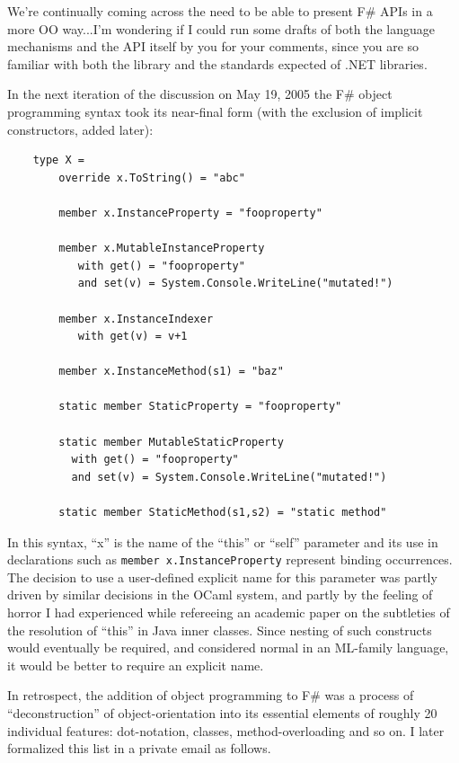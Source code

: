 \documentclass[acmsmall]{acmart}\settopmatter{}
\begin{document}
\begin{verbquote}
We're continually coming across the need to be able to present F# APIs in a more OO way...I'm wondering if I could run some drafts of both the language mechanisms and the API itself by you for your comments, since you are so familiar with both the library and the standards expected of .NET libraries. 
\end{verbquote}
In the next iteration of the discussion on May 19, 2005 the F\# object programming syntax took its near-final form (with the exclusion of implicit constructors, added later):
\begin{verbatim}
    type X =
        override x.ToString() = "abc"

        member x.InstanceProperty = "fooproperty"

        member x.MutableInstanceProperty
           with get() = "fooproperty"
           and set(v) = System.Console.WriteLine("mutated!")
    
        member x.InstanceIndexer
           with get(v) = v+1
     
        member x.InstanceMethod(s1) = "baz"

        static member StaticProperty = "fooproperty"

        static member MutableStaticProperty
          with get() = "fooproperty"
          and set(v) = System.Console.WriteLine("mutated!")
    
        static member StaticMethod(s1,s2) = "static method"
\end{verbatim}

In this syntax, ``x'' is the name of the ``this'' or ``self'' parameter and its use in declarations such as \verb$member x.InstanceProperty$ represent binding occurrences.  The decision to use a user-defined explicit name for this parameter was partly driven by similar decisions in the OCaml system, and partly by the feeling of horror I had experienced while refereeing an academic paper on the subtleties of the resolution of “this” in Java inner classes.  Since nesting of such constructs would eventually be required, and considered normal in an ML-family language, it would be better to require an explicit name.

In retrospect, the addition of object programming to F\# was a process of “deconstruction” of object-orientation into its essential elements of roughly 20 individual features: dot-notation, classes, method-overloading and so on.  I later formalized this list in a private email as follows.
\end{document}
